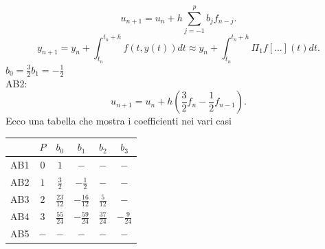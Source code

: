 \documentclass[12px]{article}
\begin{document}
   \[
	   u_{n+1} = u_n + h \sum^{p}_{j = - 1} b_j f_{n-j}
   .\] 
   \[
	   y_{n+1} = y_n + \int_{t_n}^{t_n + h} f(t,y(t))dt \approx y_n + \int_{t_n}^{t_n + h} \Pi_1 f[\ldots] (t) dt 
   .\] 
$b_0 = \frac 3 2 b_1 = - \frac  12$\\
AB2:
\[
	u_{n+1} = u_n + h \left(\frac 3 2 f_n - \frac 12 f_{n-1} \right)
.\] 
Ecco una tabella che mostra i coefficienti nei vari casi
\begin{table}[h]
\centering
\renewcommand{\arraystretch}{1.5} %
\begin{tabular}{|c|c|c|c|c|c|}
\hline
    & $P$ & $b_0$           & $b_1$            & $b_2$           & $b_3$           \\ \hline
AB1 & $0$ & $1$             & $-$              & $-$             & $-$             \\ \hline
AB2 & $1$ & $\frac{3}{2}$   & $-\frac{1}{2}$   & $-$             & $-$             \\ \hline
AB3 & $2$ & $\frac{23}{12}$ & $-\frac{16}{12}$ & $\frac{5}{12}$  & $-$             \\ \hline
AB4 & $3$ & $\frac{55}{24}$ & $-\frac{59}{24}$ & $\frac{37}{24}$ & $-\frac{9}{24}$ \\ \hline
AB5 & $-$ & $-$             & $-$              & $-$             & $-$             \\ \hline
\end{tabular}
\end{table}
\newpage
\end{document}
